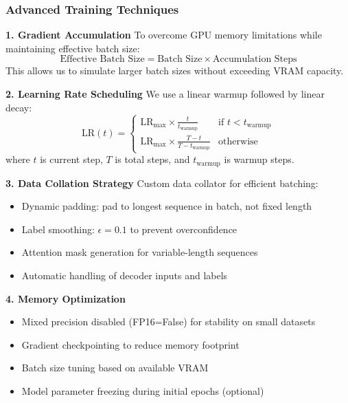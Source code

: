 \documentclass[12pt,a4paper]{article}
\begin{document}
\subsubsection{Advanced Training Techniques}

\textbf{1. Gradient Accumulation}
To overcome GPU memory limitations while maintaining effective batch size:
\begin{equation}
    \text{Effective Batch Size} = \text{Batch Size} \times \text{Accumulation Steps}
\end{equation}
This allows us to simulate larger batch sizes without exceeding VRAM capacity.

\textbf{2. Learning Rate Scheduling}
We use a linear warmup followed by linear decay:
\begin{equation}
    \text{LR}(t) = \begin{cases}
        \text{LR}_{\max} \times \frac{t}{t_{\text{warmup}}} & \text{if } t < t_{\text{warmup}} \\
        \text{LR}_{\max} \times \frac{T - t}{T - t_{\text{warmup}}} & \text{otherwise}
    \end{cases}
\end{equation}
where $t$ is current step, $T$ is total steps, and $t_{\text{warmup}}$ is warmup steps.

\textbf{3. Data Collation Strategy}
Custom data collator for efficient batching:
\begin{itemize}
    \item Dynamic padding: pad to longest sequence in batch, not fixed length
    \item Label smoothing: $\epsilon = 0.1$ to prevent overconfidence
    \item Attention mask generation for variable-length sequences
    \item Automatic handling of decoder inputs and labels
\end{itemize}

\textbf{4. Memory Optimization}
\begin{itemize}
    \item Mixed precision disabled (FP16=False) for stability on small datasets
    \item Gradient checkpointing to reduce memory footprint
    \item Batch size tuning based on available VRAM
    \item Model parameter freezing during initial epochs (optional)
\end{itemize}
\end{document}
